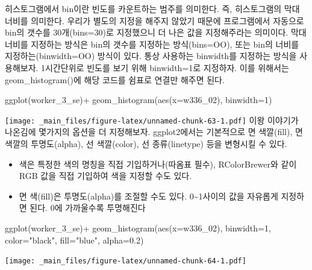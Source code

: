 \documentclass[
]{book}
\newenvironment{Shaded}{\begin{snugshade}}{\end{snugshade}}
\newcommand{\AttributeTok}[1]{\textcolor[rgb]{0.77,0.63,0.00}{#1}}
\newcommand{\DecValTok}[1]{\textcolor[rgb]{0.00,0.00,0.81}{#1}}
\newcommand{\FloatTok}[1]{\textcolor[rgb]{0.00,0.00,0.81}{#1}}
\newcommand{\FunctionTok}[1]{\textcolor[rgb]{0.00,0.00,0.00}{#1}}
\newcommand{\NormalTok}[1]{#1}
\newcommand{\SpecialCharTok}[1]{\textcolor[rgb]{0.00,0.00,0.00}{#1}}
\newcommand{\StringTok}[1]{\textcolor[rgb]{0.31,0.60,0.02}{#1}}
\providecommand{\tightlist}{%
  \setlength{\itemsep}{0pt}\setlength{\parskip}{0pt}}
\theoremstyle{definition}
\theoremstyle{definition}
\theoremstyle{definition}
\theoremstyle{definition}
\theoremstyle{remark}
\begin{document}
히스토그램에서 bin이란 빈도를 카운트하는 범주를 의미한다. 즉, 히스토그램의 막대 너비를 의미한다. 우리가 별도의 지정을 해주지 않았기 때문에 프로그램에서 자동으로 bin의 갯수를 30개(bins=30)로 지정했으니 더 나은 값을 지정해주라는 의미이다. 막대 너비를 지정하는 방식은 bin의 갯수를 지정하는 방식(bins=OO), 또는 bin의 너비를 지정하는(binwidth=OO) 방식이 있다. 통상 사용하는 binwidth를 지정하는 방식을 사용해보자. 1시간단위로 빈도를 보기 위해 binwidth=1로 지정하자. 이를 위해서는 geom\_histogram()에 해당 코드를 쉼표로 연결만 해주면 된다.

\begin{Shaded}
\begin{Highlighting}[]
\FunctionTok{ggplot}\NormalTok{(worker\_3\_se)}\SpecialCharTok{+}
  \FunctionTok{geom\_histogram}\NormalTok{(}\FunctionTok{aes}\NormalTok{(}\AttributeTok{x=}\NormalTok{w336\_02), }\AttributeTok{binwidth=}\DecValTok{1}\NormalTok{)}
\end{Highlighting}
\end{Shaded}

\texttt{[image: \_main\_files/figure-latex/unnamed-chunk-63-1.pdf]}
이왕 이야기가 나온김에 몇가지의 옵션을 더 지정해보자. ggplot2에서는 기본적으로 면 색깔(fill), 면색깔의 투명도(alpha), 선 색깔(color), 선 종류(linetype) 등을 변형시킬 수 있다.

\begin{itemize}
\tightlist
\item
  색은 특정한 색의 명칭을 직접 기입하거나(따옴표 필수), RColorBrewer와 같이 RGB 값을 직접 기입하여 색을 지정할 수도 있다.
\item
  면 색(fill)은 투명도(alpha)를 조절할 수도 있다. 0\textasciitilde1사이의 값을 자유롭게 지정하면 된다. 0에 가까울수록 투명해진다
\end{itemize}

\begin{Shaded}
\begin{Highlighting}[]
\FunctionTok{ggplot}\NormalTok{(worker\_3\_se)}\SpecialCharTok{+}
  \FunctionTok{geom\_histogram}\NormalTok{(}\FunctionTok{aes}\NormalTok{(}\AttributeTok{x=}\NormalTok{w336\_02), }\AttributeTok{binwidth=}\DecValTok{1}\NormalTok{, }\AttributeTok{color=}\StringTok{"black"}\NormalTok{, }\AttributeTok{fill=}\StringTok{"blue"}\NormalTok{, }\AttributeTok{alpha=}\FloatTok{0.2}\NormalTok{)}
\end{Highlighting}
\end{Shaded}

\texttt{[image: \_main\_files/figure-latex/unnamed-chunk-64-1.pdf]}
\end{document}
